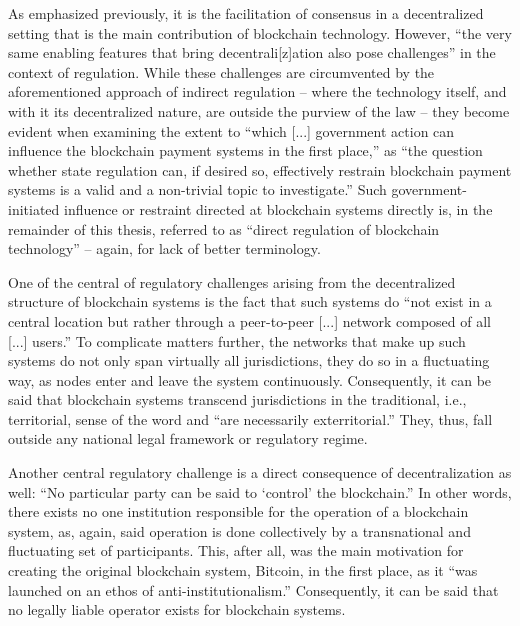 As emphasized previously, it is the facilitation of consensus in a decentralized setting that is the main contribution of blockchain technology.
However, ``the very same enabling features that bring decentrali[z]ation also pose challenges'' in the context of regulation. \autocite[209]{ellul2020}
While these challenges are circumvented by the aforementioned approach of indirect regulation -- where the technology itself, and with it its decentralized nature, are outside the purview of the law -- they become evident when examining the extent to ``which [...] government action can influence the blockchain payment systems in the first place,'' as ``the question whether state regulation can, if desired so, effectively restrain blockchain payment systems is a valid and a non-trivial topic to investigate.'' \autocite[2]{shanaev2019}
Such government-initiated influence or restraint directed at blockchain systems directly is, in the remainder of this thesis, referred to as ``direct regulation of blockchain technology'' --  again, for lack of better terminology.

One of the central of regulatory challenges arising from the decentralized structure of blockchain systems is the fact that such systems do ``not exist in a central location but rather through a peer-to-peer [...] network composed of all [...] users.'' \autocite[1128]{tsukerman2015}
To complicate matters further, the networks that make up such systems do not only span virtually all jurisdictions, they do so in a fluctuating way, as nodes enter and leave the system continuously.
Consequently, it can be said that blockchain systems transcend jurisdictions in the traditional, i.e., territorial, sense of the word and ``are necessarily exterritorial.'' \autocite[2]{shanaev2019}
They, thus, fall outside any national legal framework or regulatory regime.

Another central regulatory challenge is a direct consequence of decentralization as well:
``No particular party can be said to `control' the blockchain.'' \autocite[1129]{tsukerman2015}
In other words, there exists no one institution responsible for the operation of a blockchain system, as, again, said operation is done collectively by a transnational and fluctuating set of participants.
This, after all, was the main motivation for creating the original blockchain system, Bitcoin, in the first place, as it ``was launched on an ethos of anti-institutionalism.'' \autocite[6]{yeoh2017}
Consequently, it can be said that no legally liable operator exists for blockchain systems.

